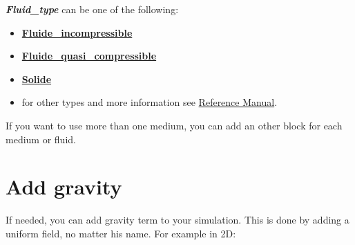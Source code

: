     \begin{center}
    \end{center}

{\bf{\textit{Fluid\_type}}} can be one of the following:
\begin{itemize}
\item \href{../../Outils/TRIOXDATA/XTriou/doc.pdf\#fluideincompressible}{\textbf{Fluide\_incompressible}}
\item \href{../../Outils/TRIOXDATA/XTriou/doc.pdf\#fluidequasicompressible}{\textbf{Fluide\_quasi\_compressible}}
\item \href{../../Outils/TRIOXDATA/XTriou/doc.pdf\#solide}{\textbf{Solide}}
\item for other types and more information see \href{../../Outils/TRIOXDATA/XTriou/doc.pdf\#milieubase}{\trust Reference Manual}.
\end{itemize}

If you want to use more than one medium, you can add an other block for each medium or fluid.\\





\section{Add gravity}
If needed, you can add gravity term to your simulation. This is done by adding
a uniform field, no matter his name. For example in 2D:

    \begin{center}
    \end{center}




